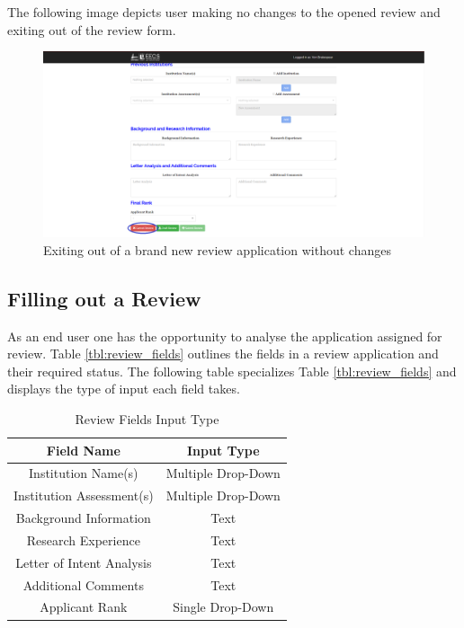 \documentclass[fontsize=12pt,paper=letter,twoside]{scrartcl}
\begin{document}
\bigskip
\noindent The following image depicts user making no changes to the opened review and exiting out of the review form.

\begin{figure}[!htb]
\begin{center}
\includegraphics[width=.9\textwidth]{images/new_review_exit_wo_changes.png}
\end{center}
\caption{Exiting out of a brand new review application without changes}
\label{fig:new_review_exit_w/o_changes}
\end{figure}

\subsection{Filling out a Review}
As an end user one has the opportunity to analyse the application assigned for review. Table \ref{tbl:review_fields} outlines the fields in a review application and their required status. The following table specializes Table \ref{tbl:review_fields} and displays the type of input each field takes.

\begin{table}[h]
\centering
\begin{tabular}{|c | c |}
	\cline{1-2}
	\textbf{Field Name} & \textbf{Input Type}\\ \hline
	Institution Name(s) & Multiple Drop-Down \\ \hline
	Institution Assessment(s) & Multiple Drop-Down \\ \hline
	Background Information & Text \\ \hline
	Research Experience & Text \\ \hline
	Letter of Intent Analysis & Text \\ \hline
	Additional Comments & Text \\ \hline
	Applicant Rank & Single Drop-Down \\ \hline
\end{tabular}
\caption {Review Fields Input Type}
\label{tbl:review_fields_input}
\end{table}
\end{document}
